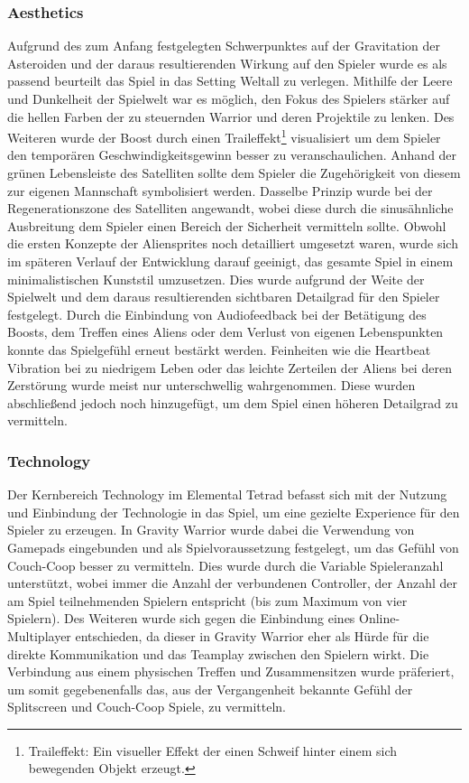 \documentclass[11pt]{scrartcl}
\begin{document}
\subsubsection{Aesthetics}
Aufgrund des zum Anfang festgelegten Schwerpunktes auf der Gravitation der Asteroiden und der daraus resultierenden Wirkung auf den Spieler wurde es als passend beurteilt das Spiel in das Setting Weltall zu verlegen. Mithilfe der Leere und Dunkelheit der Spielwelt war es möglich, den Fokus des Spielers stärker auf die hellen Farben der zu steuernden Warrior und deren Projektile zu lenken. Des Weiteren wurde der Boost durch einen Traileffekt\footnote{Traileffekt: Ein visueller Effekt der einen Schweif hinter einem sich bewegenden Objekt erzeugt.} visualisiert um dem Spieler den temporären Geschwindigkeitsgewinn besser zu veranschaulichen. Anhand der grünen Lebensleiste des Satelliten sollte dem Spieler die Zugehörigkeit von diesem zur eigenen Mannschaft symbolisiert werden. Dasselbe Prinzip wurde bei der Regenerationszone des Satelliten angewandt, wobei diese durch die sinusähnliche Ausbreitung dem Spieler einen Bereich der Sicherheit vermitteln sollte. 
Obwohl die ersten Konzepte der Aliensprites noch detailliert umgesetzt waren, wurde sich im späteren Verlauf der Entwicklung darauf geeinigt, das gesamte Spiel in einem minimalistischen Kunststil umzusetzen. Dies wurde aufgrund der Weite der Spielwelt und dem daraus resultierenden sichtbaren Detailgrad für den Spieler festgelegt.
Durch die Einbindung von Audiofeedback bei der Betätigung des Boosts, dem Treffen eines Aliens oder dem Verlust von eigenen Lebenspunkten konnte das Spielgefühl erneut bestärkt werden. Feinheiten wie die Heartbeat Vibration bei zu niedrigem Leben oder das leichte Zerteilen der Aliens bei deren Zerstörung wurde meist nur unterschwellig wahrgenommen. Diese wurden abschließend jedoch noch hinzugefügt, um dem Spiel einen höheren Detailgrad zu vermitteln.

\subsubsection{Technology}
\label{subsec:tech}
Der Kernbereich Technology im Elemental Tetrad befasst sich mit der Nutzung und Einbindung der Technologie in das Spiel, um eine gezielte Experience für den Spieler zu erzeugen\cite[~p.412]{S2014}. In Gravity Warrior wurde dabei die Verwendung von Gamepads eingebunden und als Spielvoraussetzung festgelegt, um das Gefühl von Couch-Coop besser zu vermitteln. Dies wurde durch die Variable Spieleranzahl unterstützt, wobei immer die Anzahl der verbundenen Controller, der Anzahl der am Spiel teilnehmenden Spielern entspricht (bis zum Maximum von vier Spielern). Des Weiteren wurde sich gegen die Einbindung eines Online-Multiplayer entschieden, da dieser in Gravity Warrior eher als Hürde für die direkte Kommunikation und das Teamplay zwischen den Spielern wirkt. Die Verbindung aus einem physischen Treffen und Zusammensitzen wurde präferiert, um somit gegebenenfalls das, aus der Vergangenheit bekannte Gefühl der Splitscreen und Couch-Coop Spiele, zu vermitteln.
\end{document}
